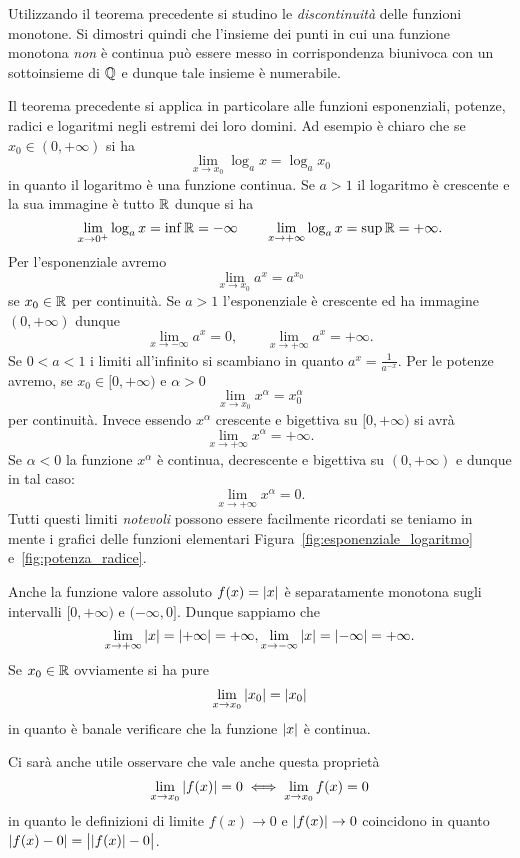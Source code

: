 \begin{exercise}
  Utilizzando il teorema precedente si studino le \emph{discontinuità}
  delle funzioni monotone. 
  Si dimostri quindi che l'insieme dei punti in cui una funzione monotona 
  \emph{non} è continua può essere messo in corrispondenza biunivoca 
  con un sottoinsieme di ${\mathbb Q}$ e dunque tale insieme è numerabile.
\end{exercise}

Il teorema precedente si applica in particolare alle funzioni 
esponenziali, potenze, radici e logaritmi negli estremi dei loro 
domini. Ad esempio è chiaro che se $x_0\in (0,+\infty)$ 
si ha 
\[
  \lim_{x\to x_0} \log_a x = \log_a x_0
\]
in quanto il logaritmo è una funzione continua. 
Se $a>1$ il logaritmo è crescente e la sua immagine è tutto ${\mathbb R}$ 
dunque si ha 
\[
  \lim_{x\to 0^+} \log_a x = \inf {\mathbb R} = -\infty
  \qquad
  \lim_{x\to +\infty} \log_a x = \sup {\mathbb R} = +\infty.
\]
Per l'esponenziale avremo 
\[
 \lim_{x\to x_0} a^x = a^{x_0}
\]
se $x_0\in {\mathbb R}$ per continuità. 
Se $a>1$ l'esponenziale è crescente 
ed ha immagine $(0,+\infty)$ dunque 
\[
  \lim_{x\to -\infty} a^x = 0, \qquad 
  \lim_{x\to +\infty} a^x = +\infty.
\]
Se $0<a<1$ i limiti all'infinito 
si scambiano in quanto $a^{x}= \frac{1}{a^{-x}}$.
Per le potenze avremo, se $x_0\in[0,+\infty)$ e $\alpha>0$
\[
  \lim_{x\to x_0} x^\alpha = x_0^\alpha
\]
per continuità. Invece essendo $x^\alpha$ crescente e bigettiva 
su $[0,+\infty)$ si avrà 
\[
  \lim_{x\to +\infty} x^\alpha = +\infty.
\]
Se $\alpha<0$ la funzione $x^\alpha$ è continua, decrescente e bigettiva 
su $(0,+\infty)$ e dunque in tal caso:
\[
  \lim_{x\to +\infty} x^\alpha = 0.
\]
Tutti questi limiti \emph{notevoli} possono essere facilmente 
ricordati se teniamo in mente i grafici delle funzioni elementari
Figura~\ref{fig:esponenziale_logaritmo} e~\ref{fig:potenza_radice}.

Anche la funzione valore assoluto $f(x)={\left|x\right|}$ è separatamente 
monotona sugli intervalli $[0,+\infty)$ e $(-\infty,0]$. 
Dunque sappiamo che 
\[
  \lim_{x\to +\infty} {\left|x\right|} = {\left|+\infty\right|} = +\infty, 
  \lim_{x\to -\infty} {\left|x\right|} = {\left|-\infty\right|} = +\infty.
\]
Se $x_0\in {\mathbb R}$ ovviamente si ha pure
\[
  \lim_{x\to x_0} {\left|x_0\right|} = {\left|x_0\right|}
\]
in quanto è banale verificare che la funzione ${\left|x\right|}$ è continua.

Ci sarà anche utile osservare che vale anche questa proprietà 
\[
\lim_{x\to x_0} {\left|f(x)\right|} = 0 \iff 
\lim_{x\to x_0} f(x) = 0
\]
in quanto le definizioni di limite $f(x)\to 0$ e ${\left|f(x)\right|}\to 0$ 
coincidono in quanto ${\left|f(x)-0\right|} = \big\lvert{{\left|f(x)\right|} - 0}\big\rvert$.

